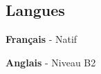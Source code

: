 \subsection*{\textcolor{maincolor}{} Langues}
\small
\hspace{2pt}\textbf{Français} - Natif

\vspace{1pt}
\hspace{2pt}\textbf{Anglais} - Niveau B2
